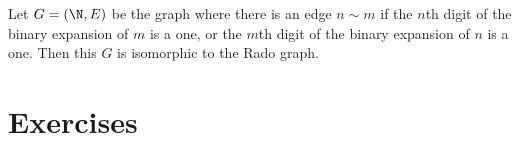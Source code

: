 \documentclass[nobib]{tufte-handout}
\begin{document}
\begin{proposition}
    Let $G = (\N, E)$ be the graph where there is an edge $n \sim m$ if the $n$th digit of the binary expansion of $m$ is a one, or the $m$th digit of the binary expansion of $n$ is a one. Then this $G$ is isomorphic to the Rado graph.
\end{proposition}

\section{Exercises}


%
%
\end{document}
